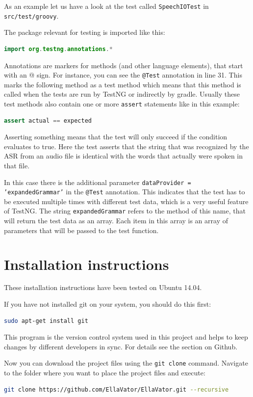 \documentclass[a4paper, 12pt]{article}
\begin{document}
As an example let us have a look at the test called \texttt{SpeechIOTest} in \texttt{src/test/groovy}.

The package relevant for testing is imported like this:
\begin{lstlisting}[language=java]
import org.testng.annotations.*
\end{lstlisting}
Annotations are markers for methods (and other language elements), that start with an @ sign.
For instance, you can see the \texttt{@Test} annotation in line 31.
This marks the following method as a test method which means that this method is called when the tests are run by TestNG or indirectly by gradle.
Usually these test methods also contain one or more \texttt{assert} statements like in this example:
\begin{lstlisting}[language=java]
assert actual == expected
\end{lstlisting}
Asserting something means that the test will only succeed if the condition evaluates to true.
Here the test asserts that the string that was recognized by the ASR from an audio file is identical with the words that actually were spoken in that file.

In this case there is the additional parameter \texttt{dataProvider = 'expandedGrammar'} in the \texttt{@Test} annotation.
This indicates that the test has to be executed multiple times with different test data, which is a very useful feature of TestNG.
The string \texttt{expandedGrammar} refers to the method of this name, that will return the test data as an array.
Each item in this array is an array of parameters that will be passed to the test function.

\newpage
\section{Installation instructions}
\label{sec:Installation_instructions}
These installation instructions have been tested on Ubuntu 14.04.

If you have not installed git on your system, you should do this first:
\begin{lstlisting}[language=bash]
sudo apt-get install git
\end{lstlisting}

This program is the version control system used in this project and helps to keep changes by different developers in sync.
For details see the section on Github.

Now you can download the project files using the \texttt{git clone} command.
Navigate to the folder where you want to place the project files and execute:
\begin{lstlisting}[language=bash]
git clone https://github.com/EllaVator/EllaVator.git --recursive
\end{lstlisting}
\end{document}
